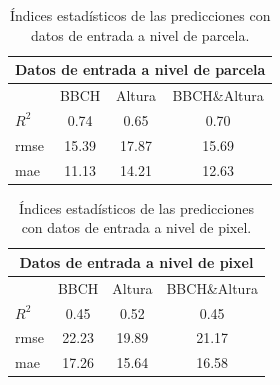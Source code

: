 \begin{table}[h]
\centering
\begin{tabular}{lccc}
\multicolumn{4}{c}{Datos de entrada a nivel de parcela}                            \\ \hline \hline
\multicolumn{1}{l|}{}                            & BBCH  & Altura & BBCH\&Altura \\ \cline{2-4} 
\multicolumn{1}{l|}{$R^2$}                       & 0.74  & 0.65   & 0.70 \\
\multicolumn{1}{l|}{\gls{rmse}} 				 & 15.39 & 17.87  & 15.69 \\
\multicolumn{1}{l|}{\gls{mae}}  				 & 11.13 & 14.21  & 12.63       
\end{tabular}
\caption{Índices estadísticos de las predicciones con datos de entrada a nivel de parcela. \label{tab:errorpc}}
\end{table}

\begin{table}[h]
\centering
\begin{tabular}{lccc}
\multicolumn{4}{c}{Datos de entrada a nivel de pixel}                            \\ \hline \hline
\multicolumn{1}{l|}{}                            & BBCH  & Altura & BBCH\&Altura \\ \cline{2-4} 
\multicolumn{1}{l|}{$R^2$}                       & 0.45  & 0.52   & 0.45         \\
\multicolumn{1}{l|}{\gls{rmse}} 				 & 22.23 & 19.89  & 21.17        \\
\multicolumn{1}{l|}{\gls{mae}}  				 & 17.26 & 15.64  & 16.58       
\end{tabular}
\caption{Índices estadísticos de las predicciones con datos de entrada a nivel de pixel.\label{tab:errorpx}}
\end{table}


